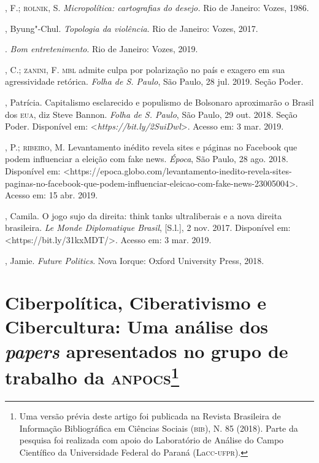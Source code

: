 \begin{bibliohedra}
, F.; \textsc{rolnik}, S. \emph{Micropolítica: cartografias do desejo.}
Rio de Janeiro: Vozes, 1986.

, Byung"-Chul. \emph{Topologia da violência}. Rio de Janeiro: Vozes,
2017.

\titidem. \emph{Bom entretenimento}. Rio de Janeiro: Vozes, 2019.

, C.; \textsc{zanini}, F. \textsc{mbl} admite culpa por polarização no país e
exagero em sua agressividade retórica. \emph{Folha de S. Paulo}, São
Paulo, 28 jul. 2019. Seção Poder.

, Patrícia. Capitalismo esclarecido e populismo de Bolsonaro
aproximarão o Brasil dos \textsc{eua}, diz Steve Bannon. \emph{Folha de S.
Paulo}, São Paulo, 29 out. 2018. Seção Poder. Disponível em:
\textless{}\emph{https://bit.ly/2SuiDwl}\textgreater{}.
Acesso em: 3 mar. 2019.

, P.; \textsc{ribeiro}, M. Levantamento inédito revela sites e páginas
no Facebook que podem influenciar a eleição com fake news. \emph{Época},
São Paulo, 28 ago. 2018. Disponível em:
\textless{}https://epoca.globo.com/levantamento-inedito-revela-sites-paginas-no-facebook-que-podem-influenciar-eleicao-com-fake-news-23005004\textgreater{}.
Acesso em: 15 abr. 2019.

, Camila. O jogo sujo da direita: think tanks ultraliberais e a
nova direita brasileira. \emph{Le Monde Diplomatique Brasil},
{[}S.l.{]}, 2 nov. 2017. Disponível em:
\textless{}https://bit.ly/31kxMDT/\textgreater{}.
Acesso em: 3 mar. 2019.

, Jamie. \emph{Future Politics}. Nova Iorque: Oxford University
Press, 2018.
\end{bibliohedra}

\chapter*{Ciberpolítica, Ciberativismo e Cibercultura: Uma análise dos
\emph{papers} apresentados no grupo de trabalho da \textsc{anpocs}\footnote{Uma
  versão prévia deste artigo foi publicada na Revista Brasileira de
  Informação Bibliográfica em Ciências Sociais (\textsc{bib}), N. 85 (2018).
  Parte da pesquisa foi realizada com apoio do Laboratório de Análise do
  Campo Científico da Universidade Federal do Paraná (La\textsc{cc}-\textsc{ufpr}).}}

